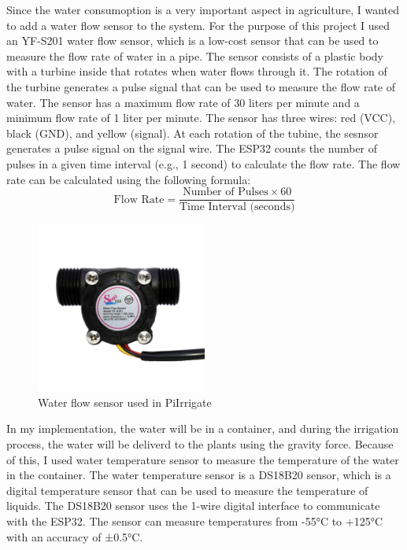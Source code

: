 Since the water consumoption is a very important aspect in agriculture, 
I wanted to add a water flow sensor to the system. For the purpose of this project I used an 
YF-S201 water flow sensor, 
which is a low-cost sensor that can be used to measure the flow rate of water in a pipe.
The sensor consists of a plastic body with a 
turbine inside that rotates when water flows through it.
The rotation of the turbine generates a pulse signal that can be used to measure the 
flow rate of water.
The sensor has a maximum flow rate of 30 liters per minute and a minimum 
flow rate of 1 liter per minute.
The sensor has three wires: red (VCC), black (GND), and yellow (signal).
At each rotation of the tubine, the sesnsor generates a pulse signal on the signal wire.
The ESP32 counts the number of pulses in a given time interval 
(e.g., 1 second) to calculate the flow rate.
The flow rate can be calculated using the following formula:
\begin{equation}
    \text{Flow Rate} = \frac{\text{Number of Pulses} \times 60}{\text{Time Interval (seconds)}}
\end{equation}
\begin{figure}[H]
    \centering
    \includegraphics[width=0.5\textwidth]{images/water-flow.jpg}
    \caption{Water flow sensor used in PiIrrigate}
    \label{fig:water-flow-sensor}
\end{figure}

In my implementation, the water will be in a container, and during the irrigation process, 
the water will be deliverd to the plants using the gravity force. Because of this, I used
water temperature sensor to measure the temperature of the water in the container. 
The water temperature sensor is a DS18B20 sensor, 
which is a digital temperature sensor that can be used to measure the temperature of liquids.
The DS18B20 sensor uses the 1-wire digital interface to communicate with the ESP32.
The sensor can measure temperatures from -55°C to +125°C with an accuracy of ±0.5°C.

